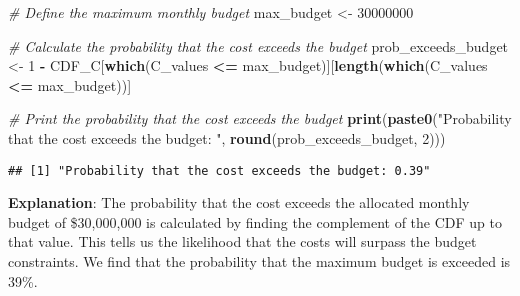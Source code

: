 \documentclass[
  11pt,
]{article}
\newenvironment{Shaded}{\begin{snugshade}}{\end{snugshade}}
\newcommand{\CommentTok}[1]{\textcolor[rgb]{0.56,0.35,0.01}{\textit{#1}}}
\newcommand{\DecValTok}[1]{\textcolor[rgb]{0.00,0.00,0.81}{#1}}
\newcommand{\FunctionTok}[1]{\textcolor[rgb]{0.13,0.29,0.53}{\textbf{#1}}}
\newcommand{\NormalTok}[1]{#1}
\newcommand{\OtherTok}[1]{\textcolor[rgb]{0.56,0.35,0.01}{#1}}
\newcommand{\SpecialCharTok}[1]{\textcolor[rgb]{0.81,0.36,0.00}{\textbf{#1}}}
\newcommand{\StringTok}[1]{\textcolor[rgb]{0.31,0.60,0.02}{#1}}
\begin{document}
\begin{Shaded}
\begin{Highlighting}[]
\CommentTok{\# Define the maximum monthly budget}
\NormalTok{max\_budget }\OtherTok{\textless{}{-}} \DecValTok{30000000}

\CommentTok{\# Calculate the probability that the cost exceeds the budget}
\NormalTok{prob\_exceeds\_budget }\OtherTok{\textless{}{-}} \DecValTok{1} \SpecialCharTok{{-}}\NormalTok{ CDF\_C[}\FunctionTok{which}\NormalTok{(C\_values }\SpecialCharTok{\textless{}=}\NormalTok{ max\_budget)][}\FunctionTok{length}\NormalTok{(}\FunctionTok{which}\NormalTok{(C\_values }\SpecialCharTok{\textless{}=}\NormalTok{ max\_budget))]}

\CommentTok{\# Print the probability that the cost exceeds the budget}
\FunctionTok{print}\NormalTok{(}\FunctionTok{paste0}\NormalTok{(}\StringTok{"Probability that the cost exceeds the budget: "}\NormalTok{, }\FunctionTok{round}\NormalTok{(prob\_exceeds\_budget, }\DecValTok{2}\NormalTok{)))}
\end{Highlighting}
\end{Shaded}

\begin{verbatim}
## [1] "Probability that the cost exceeds the budget: 0.39"
\end{verbatim}

\textbf{Explanation}: The probability that the cost exceeds the
allocated monthly budget of \$30,000,000 is calculated by finding the
complement of the CDF up to that value. This tells us the likelihood
that the costs will surpass the budget constraints. We find that the
probability that the maximum budget is exceeded is 39\%.
\end{document}
